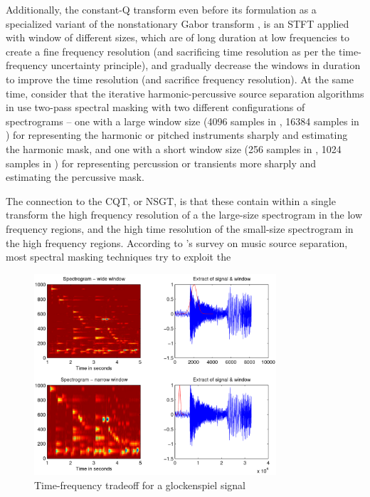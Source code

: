 \documentclass[letter,12pt,notitlepage]{article}
\begin{document}
Additionally, the constant-Q transform \cite{jbrown, klapuricqt, invertiblecqt} even before its formulation as a specialized variant of the nonstationary Gabor transform \cite{balazs}, is an STFT applied with window of different sizes, which are of long duration at low frequencies to create a fine frequency resolution (and sacrificing time resolution as per the time-frequency uncertainty principle), and gradually decrease the windows in duration to improve the time resolution (and sacrifice frequency resolution). At the same time, consider that the iterative harmonic-percussive source separation algorithms in \cite{driedger, fitzgerald2} use two-pass spectral masking with two different configurations of spectrograms -- one with a large window size (4096 samples in \cite{driedger}, 16384 samples in \cite{fitzgerald2}) for representing the harmonic or pitched instruments sharply and estimating the harmonic mask, and one with a short window size (256 samples in \cite{driedger}, 1024 samples in \cite{fitzgerald2}) for representing percussion or transients more sharply and estimating the percussive mask.

The connection to the CQT, or NSGT, is that these contain within a single transform the high frequency resolution of a the large-size spectrogram in the low frequency regions, and the high time resolution of the small-size spectrogram in the high frequency regions. According to \textcite{musicsepgood}'s survey on music source separation, most spectral masking techniques try to exploit the 

\begin{figure}[ht]
	\centering
	\includegraphics[width=9cm]{./images-tftheory/tf_tradeoff_dorfler.png}
	\caption{Time-frequency tradeoff for a glockenspiel signal}
	\label{fig:dorflertradeoff}
\end{figure}
\end{document}
